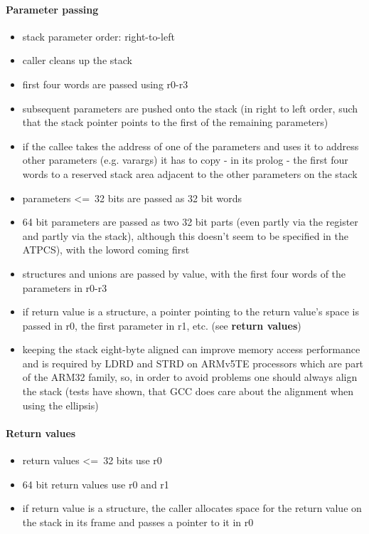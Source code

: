 \paragraph{Parameter passing}

\begin{itemize}
\item stack parameter order: right-to-left
\item caller cleans up the stack
\item first four words are passed using r0-r3
\item subsequent parameters are pushed onto the stack (in right to left order, such that the stack pointer points to the first of the remaining parameters)
\item if the callee takes the address of one of the parameters and uses it to address other parameters (e.g. varargs) it has to copy - in its prolog - the first four words to a reserved stack area adjacent to the other parameters on the stack
\item parameters \textless=\ 32 bits are passed as 32 bit words
\item 64 bit parameters are passed as two 32 bit parts (even partly via the register and partly via the stack), although this doesn't seem to be specified in the ATPCS), with the loword coming first
\item structures and unions are passed by value, with the first four words of the parameters in r0-r3
\item if return value is a structure, a pointer pointing to the return value's space is passed in r0, the first parameter in r1, etc. (see {\bf return values})
\item keeping the stack eight-byte aligned can improve memory access performance and is required by LDRD and STRD on ARMv5TE processors which are part of the ARM32 family, so, in order to avoid problems one should always align the stack (tests have shown, that GCC does care about the alignment when using the ellipsis)
\end{itemize}

\paragraph{Return values}
\begin{itemize}
\item return values \textless=\ 32 bits use r0
\item 64 bit return values use r0 and r1
\item if return value is a structure, the caller allocates space for the return value on the stack in its frame and passes a pointer to it in r0
\end{itemize}

